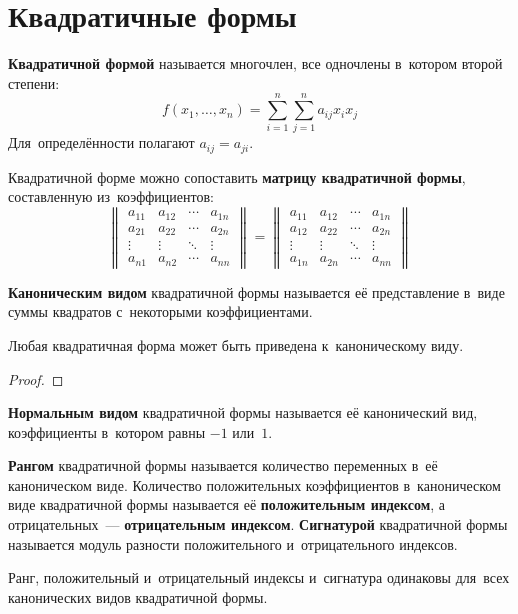 \section{Квадратичные формы}
\textbf{Квадратичной формой} называется многочлен, все одночлены в~котором второй степени:
\begin{equation*}
f(x_1, \ldots, x_n) = \sum_{i=1}^n \sum_{j=1}^n a_{ij} x_i x_j
\end{equation*}
Для~определённости полагают $a_{ij} = a_{ji}$.

Квадратичной форме можно сопоставить \textbf{матрицу квадратичной формы}, составленную из~коэффициентов:
\begin{equation*}
\begin{Vmatrix}
a_{11} & a_{12} & \cdots & a_{1n} \\
a_{21} & a_{22} & \cdots & a_{2n} \\
\vdots & \vdots & \ddots & \vdots \\
a_{n1} & a_{n2} & \cdots & a_{nn}
\end{Vmatrix} =
\begin{Vmatrix}
a_{11} & a_{12} & \cdots & a_{1n} \\
a_{12} & a_{22} & \cdots & a_{2n} \\
\vdots & \vdots & \ddots & \vdots \\
a_{1n} & a_{2n} & \cdots & a_{nn}
\end{Vmatrix}
\end{equation*}

\textbf{Каноническим видом} квадратичной формы называется её представление в~виде суммы квадратов с~некоторыми коэффициентами.

\begin{theorem}
Любая квадратичная форма может быть приведена к~каноническому виду.
\end{theorem}
\begin{proof}

\end{proof}

\textbf{Нормальным видом} квадратичной формы называется её канонический вид, коэффициенты в~котором равны $-1$ или~$1$.

\textbf{Рангом} квадратичной формы называется количество переменных в~её каноническом виде.
Количество положительных коэффициентов в~каноническом виде квадратичной формы называется её \textbf{положительным индексом}, а отрицательных~--- \textbf{отрицательным индексом}.
\textbf{Сигнатурой} квадратичной формы называется модуль разности положительного и~отрицательного индексов.

Ранг, положительный и~отрицательный индексы и~сигнатура одинаковы для~всех канонических видов квадратичной формы.